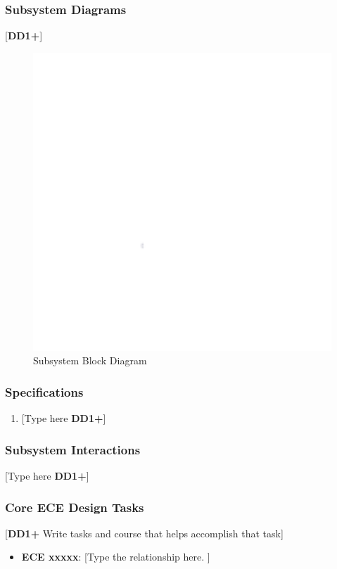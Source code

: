 \documentclass[letterpaper, 11pt]{article}
\begin{document}
\subsubsection{Subsystem Diagrams}
[\textbf{DD1+}]
\begin{figure}[h]
    \centering
    \includegraphics[width=16cm]{white.png} %
    \caption{Subsystem Block Diagram}
\end{figure} %

\subsubsection{Specifications}
\begin{enumerate}
    \item {[Type here \textbf{DD1+}]}
\end{enumerate}

\subsubsection{Subsystem Interactions}
[Type here \textbf{DD1+}]

\subsubsection{Core ECE Design Tasks}
[\textbf{DD1+} Write tasks and course that helps accomplish that task]
\begin{itemize}
    \item \textbf{ECE xxxxx}: [Type the relationship here. ]
\end{itemize}
\end{document}
